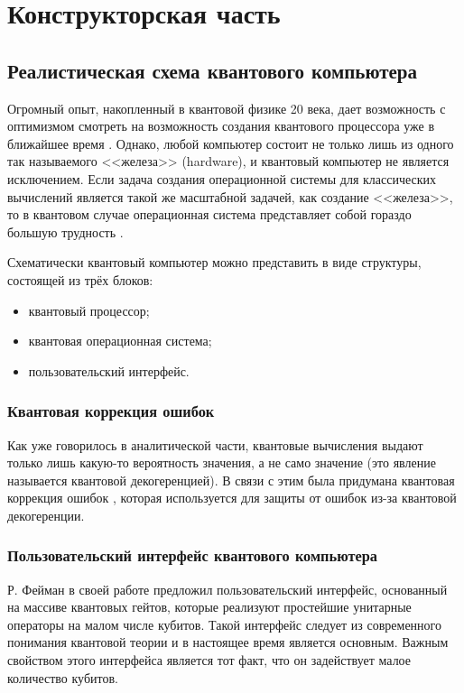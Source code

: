 \chapter{Конструкторская часть}

\section{Реалистическая схема квантового компьютера}

Огромный опыт, накопленный в квантовой физике 20 века, дает возможность с оптимизмом смотреть на возможность создания квантового процессора уже в ближайшее время \cite{quantum-computer}. Однако, любой компьютер состоит не только лишь из одного так называемого <<железа>> (hardware), и квантовый компьютер не является исключением. Если задача создания операционной системы для классических вычислений является такой же масштабной задачей, как создание <<железа>>, то в квантовом случае операционная система представляет собой гораздо большую трудность \cite{quantum-computer}.

Схематически квантовый компьютер можно представить в виде структуры, состоящей из трёх блоков:

\begin{itemize}
	\item квантовый процессор;
	\item квантовая операционная система;
	\item пользовательский интерфейс.
\end{itemize}

\subsection{Квантовая коррекция ошибок}
Как уже говорилось в аналитической части, квантовые вычисления выдают только лишь какую-то вероятность значения, а не само значение (это явление называется квантовой декогеренцией). В связи с этим была придумана квантовая коррекция ошибок \cite{quantum-codes}, которая используется для защиты от ошибок из-за квантовой декогеренции. 

\subsection{Пользовательский интерфейс квантового компьютера}

Р. Фейман в своей работе \cite{feynman} предложил пользовательский интерфейс, основанный на массиве квантовых гейтов, которые реализуют простейшие унитарные операторы на малом числе кубитов. Такой интерфейс следует из современного понимания квантовой теории \cite{quantum-computer} и в настоящее время является основным. Важным свойством этого интерфейса является тот факт, что он задействует малое количество кубитов.

